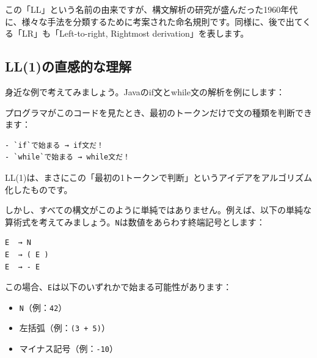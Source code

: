 この「LL」という名前の由来ですが、構文解析の研究が盛んだった1960年代に、様々な手法を分類するために考案された命名規則です。同様に、後で出てくる「LR」も「Left-to-right,
Rightmost derivation」を表します。

\hypertarget{chapter5-ll1ux306eux76f4ux611fux7684ux306aux7406ux89e3}{%
\subsection{LL(1)の直感的な理解}\label{chapter5-ll1ux306eux76f4ux611fux7684ux306aux7406ux89e3}}

身近な例で考えてみましょう。Javaのif文とwhile文の解析を例にします：

\begin{Shaded}
\begin{Highlighting}[]
\NormalTok{) \{}
    \NormalTok{(}\NormalTok{);}
\NormalTok{\}}

\NormalTok{) \{}
\NormalTok{\}}
\end{Highlighting}
\end{Shaded}

プログラマがこのコードを見たとき、最初のトークンだけで文の種類を判断できます：

\begin{verbatim}
- `if`で始まる → if文だ！
- `while`で始まる → while文だ！
\end{verbatim}

LL(1)は、まさにこの「最初の1トークンで判断」というアイデアをアルゴリズム化したものです。

しかし、すべての構文がこのように単純ではありません。例えば、以下の単純な算術式を考えてみましょう。\texttt{N}は数値をあらわす終端記号とします：

\begin{verbatim}
E  → N
E  → ( E )
E  → - E
\end{verbatim}

この場合、\texttt{E}は以下のいずれかで始まる可能性があります：

\begin{itemize}
\tightlist
\item
  \texttt{N}（例：\texttt{42}）
\item
  左括弧（例：\texttt{(3\ +\ 5)}）
\item
  マイナス記号（例：\texttt{-10}）
\end{itemize}

